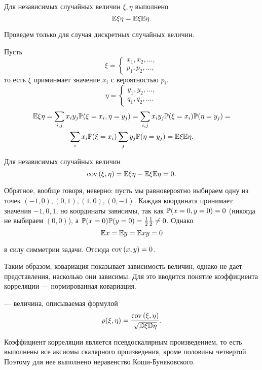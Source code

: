 \documentclass[../TV&MS.tex]{subfiles}
\begin{document}
\begin{St}
	Для независимых случайных величин $\xi, \eta$ выполнено
	$$\mathbb{E}\xi\eta = \mathbb{E}\xi\mathbb{E}\eta.$$
\end{St}
\begin{Proof}
	Проведем только для случая дискретных случайных величин.
	
	Пусть 
\[
   	\xi = 
  	\begin{cases}
  		x_1, x_2, \ldots, \\
  		p_1, p_2, \ldots,
  	\end{cases}
\]
	то есть $\xi$ приминмает значение $x_i$ с вероятностью $p_i$.
\[
   	\eta = 
  	\begin{cases}
  		y_1, y_2, \ldots,\\
  		q_1, q_2, \ldots.
  	\end{cases}
\]
\begin{multline*}
	\mathbb{E}\xi\eta=\sum\limits_{i,j} x_iy_j\mathbb{P}(\xi=x_i, \eta=y_j) = 
	\sum\limits_{i,j} x_iy_j\mathbb{P}(\xi=x_i)\mathbb{P}(\eta=y_j) = \\  
	\sum\limits_{i} x_i\mathbb{P}(\xi=x_i)\sum\limits_j y_j\mathbb{P}(\eta=y_j) = 
	\mathbb{E}\xi\mathbb{E}\eta.
\end{multline*}
\end{Proof}

Для независимых случайных величин
$${\rm cov \,}(\xi,\eta) = \mathbb{E}\xi\eta - \mathbb{E}\xi\mathbb{E}\eta = 0.$$

Обратное, вообще говоря, неверно: пусть мы равновероятно выбираем 
одну из точек $(-1, 0), (0, 1), (1, 0), (0, -1)$. Каждая координата 
принимает значения $-1, 0, 1$, но координаты зависимы, так как 
$\mathbb{P}(x=0,  y=0) = 0$ (никогда не выбираем $(0,0)$), а 
$\mathbb{P}(x=0)\mathbb{P}(y=0) = \frac12\frac12 \not=0$. Однако
$$\mathbb{E} x = \mathbb{E} y = \mathbb{E} xy = 0$$ 

\noindent
в силу симметрии задачи. Отсюда ${\rm cov \,}(x,y) = 0$.

Таким образом, ковариация показывает зависимость величин, 
однако не дает представления, насколько они зависимы. Для это вводится 
понятие коэффициента корреляции --- нормированная ковариация.

\begin{Def}
 --- величина, описываемая формулой
$$\rho(\xi, \eta) = \frac{{\rm cov \,}(\xi, \eta)}{\sqrt{\mathbb{D}\xi\mathbb{D}\eta}}.$$
\end{Def}

Коэффициент корреляции является псевдоскалярным произведением, то есть 
выполнены все аксиомы скалярного произведения, кроме половины четвертой. 
Поэтому для нее выполнено неравенство Коши-Буняковского.
\end{document}
